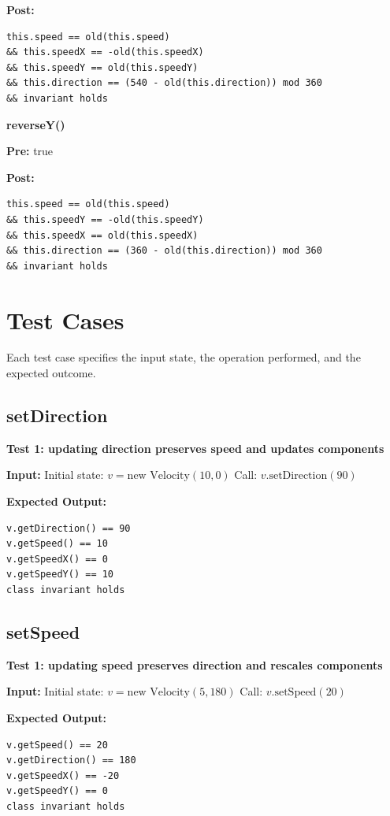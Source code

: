 \textbf{Post:}
\begin{verbatim}
this.speed == old(this.speed)
&& this.speedX == -old(this.speedX)
&& this.speedY == old(this.speedY)
&& this.direction == (540 - old(this.direction)) mod 360
&& invariant holds
\end{verbatim}

\textbf{reverseY()}

\textbf{Pre:} true

\textbf{Post:}
\begin{verbatim}
this.speed == old(this.speed)
&& this.speedY == -old(this.speedY)
&& this.speedX == old(this.speedX)
&& this.direction == (360 - old(this.direction)) mod 360
&& invariant holds
\end{verbatim}

\section{Test Cases}

Each test case specifies the input state, the operation performed, and the expected outcome.

\subsection*{setDirection}

\textbf{Test 1: updating direction preserves speed and updates components}

\textbf{Input:}  
Initial state: $v = \text{new Velocity}(10, 0)$  
Call: $v.\text{setDirection}(90)$  

\textbf{Expected Output:}
\begin{verbatim}
v.getDirection() == 90
v.getSpeed() == 10
v.getSpeedX() == 0
v.getSpeedY() == 10
class invariant holds
\end{verbatim}

\subsection*{setSpeed}

\textbf{Test 1: updating speed preserves direction and rescales components}

\textbf{Input:}  
Initial state: $v = \text{new Velocity}(5, 180)$  
Call: $v.\text{setSpeed}(20)$  

\textbf{Expected Output:}
\begin{verbatim}
v.getSpeed() == 20
v.getDirection() == 180
v.getSpeedX() == -20
v.getSpeedY() == 0
class invariant holds
\end{verbatim}

